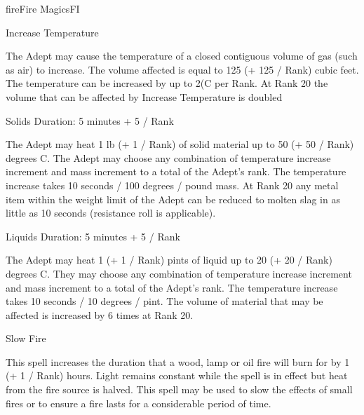 \begin{college}[2.0]{fire}{Fire Magics}{FI}
\begin{spell}[G-6]{Increase Temperature}
\begin{effects}
\begin{Description}
The Adept may cause the temperature of a closed contiguous volume of
gas (such as air) to increase. The volume affected is equal to 125 (+
125 / Rank) cubic feet. The temperature can be increased by up to 2(C
per Rank. At Rank 20 the volume that can be affected by Increase
Temperature is doubled

\item[Solids] Duration: 5 minutes + 5 / Rank

The Adept may heat 1 lb (+ 1 / Rank) of solid material up to 50 (+ 50
/ Rank) degrees C. The Adept may choose any combination of temperature
increase increment and mass increment to a total of the Adept's
rank. The temperature increase takes 10 seconds / 100 degrees / pound
mass. At Rank 20 any metal item within the weight limit of the Adept
can be reduced to molten slag in as little as 10 seconds (resistance
roll is applicable).

\item[Liquids] Duration: 5 minutes + 5 / Rank

The Adept may heat 1 (+ 1 / Rank) pints of liquid up to 20 (+ 20 /
Rank) degrees C. They may choose any combination of temperature
increase increment and mass increment to a total of the Adept's
rank. The temperature increase takes 10 seconds / 10 degrees /
pint. The volume of material that may be affected is increased by 6
times at Rank 20.
\end{Description}
\end{effects}
\end{spell}

\begin{spell}[G-7]{Slow Fire}
\begin{effects}
This spell increases the duration that a wood, lamp or oil fire will
burn for by 1 (+ 1 / Rank) hours. Light remains constant while the
spell is in effect but heat from the fire source is halved. This spell
may be used to slow the effects of small fires or to ensure a fire
lasts for a considerable period of time.
\end{effects}
\end{spell}


\end{college}
